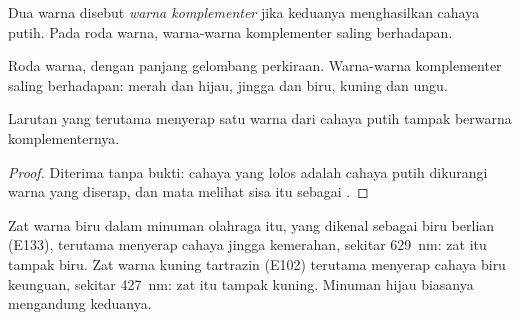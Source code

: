 \begin{definition}\label{def:g11:absorbance:complementary}
Dua warna disebut \emph{warna komplementer}
jika  keduanya menghasilkan cahaya putih. Pada roda warna,
warna-warna komplementer saling berhadapan.
\end{definition}

\begin{omfigure}

{\small Roda warna, dengan panjang gelombang perkiraan. Warna-warna
komplementer saling berhadapan: merah dan hijau, jingga dan biru, kuning
dan ungu.}
\end{omfigure}

\begin{proposition}\label{prop:g11:absorbance:colour-seen}
Larutan yang terutama menyerap satu warna dari cahaya putih tampak
berwarna komplementernya.
\end{proposition}

\begin{proof}
Diterima tanpa bukti: cahaya yang lolos adalah cahaya putih dikurangi
warna yang diserap, dan mata melihat sisa itu sebagai .
\end{proof}

\begin{example}\label{ex:g11:absorbance:dyes}
Zat warna biru dalam minuman olahraga itu, yang dikenal sebagai
biru berlian (E133), terutama menyerap cahaya jingga kemerahan, sekitar
\qty{629}{nm}: zat itu tampak biru. Zat warna kuning tartrazin (E102)
terutama menyerap cahaya biru keunguan, sekitar \qty{427}{nm}: zat itu
tampak kuning. Minuman hijau biasanya mengandung keduanya.
\end{example}


